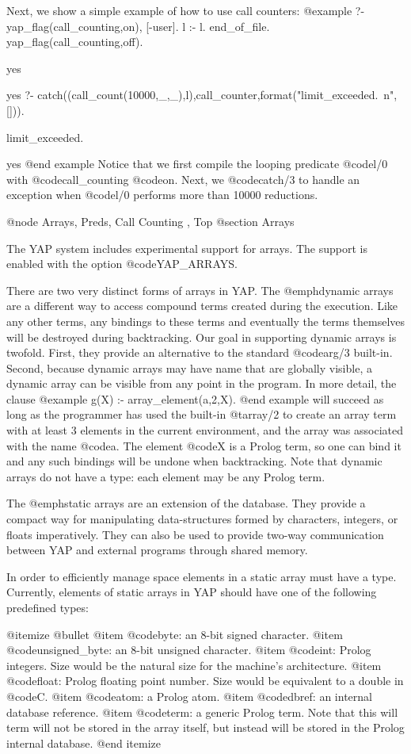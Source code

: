 {{{{{{{Next, we show a simple example of how to use call counters:
@example
   ?- yap_flag(call_counting,on), [-user]. l :- l. end_of_file. yap_flag(call_counting,off).

yes

yes
   ?- catch((call_count(10000,_,_),l),call_counter,format("limit_exceeded.~n",[])).

limit_exceeded.

yes
@end example
Notice that we first compile the looping predicate @code{l/0} with
@code{call_counting} @code{on}. Next, we @code{catch/3} to handle an
exception when @code{l/0} performs more than 10000 reductions.


@node Arrays, Preds, Call Counting , Top
@section Arrays

The YAP system includes experimental support for arrays. The
support is enabled with the option @code{YAP_ARRAYS}.

There are two very distinct forms of arrays in YAP. The
@emph{dynamic arrays} are a different way to access compound terms
created during the execution. Like any other terms, any bindings to
these terms and eventually the terms themselves will be destroyed during
backtracking. Our goal in supporting dynamic arrays is twofold. First,
they provide an alternative to the standard @code{arg/3}
built-in. Second, because dynamic arrays may have name that are globally
visible, a dynamic array can be visible from any point in the
program. In more detail, the clause
@example
g(X) :- array_element(a,2,X).
@end example
will succeed as long as the programmer has used the built-in @t{array/2}
to create an array term with at least 3 elements in the current
environment, and the array was associated with the name @code{a}.  The
element @code{X} is a Prolog term, so one can bind it and any such
bindings will be undone when backtracking. Note that dynamic arrays do
not have a type: each element may be any Prolog term.

The @emph{static arrays} are an extension of the database. They provide
a compact way for manipulating data-structures formed by characters,
integers, or floats imperatively. They can also be used to provide
two-way communication between YAP and external programs through
shared memory.

In order to efficiently manage space elements in a static array must
have a type. Currently, elements of static arrays in YAP should
have one of the following predefined types:

@itemize @bullet
@item  @code{byte}: an 8-bit signed character.
@item  @code{unsigned_byte}: an 8-bit unsigned character.
@item  @code{int}: Prolog integers. Size would be the natural size for
the machine's architecture.
@item  @code{float}: Prolog floating point number. Size would be equivalent
to a double in @code{C}.
@item  @code{atom}: a Prolog atom.
@item  @code{dbref}: an internal database reference.
@item  @code{term}: a generic Prolog term. Note that this will term will
not be stored in the array itself, but instead will be stored in the
Prolog internal database.
@end itemize

}}}}}}}
